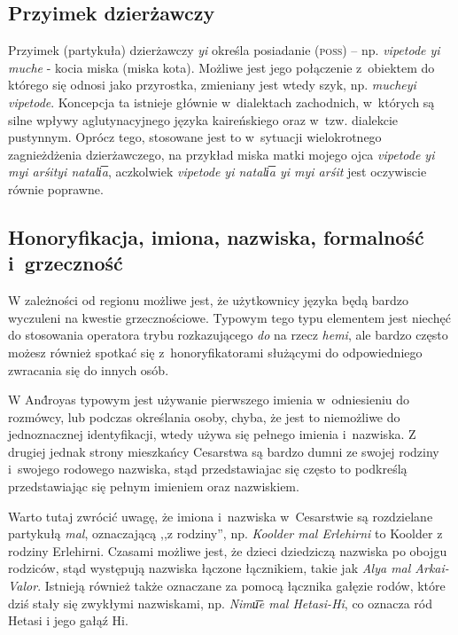 \begin{spacing}{1.1}

\subsection{Przyimek dzierżawczy}

Przyimek (partykuła) dzierżawczy \emph{yi} określa posiadanie (\textsc{poss}) --
np. \emph{vipetode yi muche} - kocia miska (miska kota). Możliwe jest jego
połączenie z~obiektem do którego się odnosi jako przyrostka, zmieniany jest
wtedy szyk, np. \emph{mucheyi vipetode}. Koncepcja ta istnieje głównie
w~dialektach zachodnich, w~których są silne wpływy aglutynacyjnego języka
kaireńskiego oraz w~tzw. dialekcie pustynnym. Oprócz tego, stosowane jest to
w~sytuacji wielokrotnego zagnieżdżenia dzierżawczego, na przykład miska matki
mojego ojca \emph{vipetode yi myi arśityi natali͞a}, aczkolwiek \emph{vipetode
yi natali͞a yi myi arśit} jest oczywiscie równie poprawne. 

\subsection{Honoryfikacja, imiona, nazwiska, formalność i~grzeczność}

W zależności od regionu możliwe jest, że użytkownicy języka będą bardzo
wyczuleni na kwestie grzecznościowe. Typowym tego typu elementem jest niechęć do
stosowania operatora trybu rozkazującego \emph{do} na rzecz \emph{hemi}, ale
bardzo często możesz również spotkać się z~honoryfikatorami służącymi do
odpowiedniego zwracania się do innych osób.

W And́royas typowym jest używanie pierwszego imienia w~odniesieniu do rozmówcy,
lub podczas określania osoby, chyba, że jest to niemożliwe do jednoznacznej
identyfikacji, wtedy używa się pełnego imienia i~nazwiska. Z drugiej jednak
strony mieszkańcy Cesarstwa są bardzo dumni ze swojej rodziny i~swojego rodowego
nazwiska, stąd przedstawiajac się często to podkreślą przedstawiając się pełnym
imieniem oraz nazwiskiem.


Warto tutaj zwrócić uwagę, że imiona i~nazwiska w~Cesarstwie są rozdzielane
partykułą \emph{mal}, oznaczającą ,,z rodziny'', np. \emph{Koolder mal
Erlehirni} to Koolder z rodziny Erlehirni. Czasami możliwe jest, że dzieci
dziedziczą nazwiska po obojgu rodziców, stąd występują nazwiska łączone
łącznikiem, takie jak \emph{Alya mal Arkai-Valor}. Istnieją również także
oznaczane za pomocą łącznika gałęzie rodów, które dziś stały się zwykłymi
nazwiskami, np. \emph{Nimu͞e mal Hetasi-Hi}, co oznacza ród Hetasi i jego gałąź
Hi.


\end{spacing}
